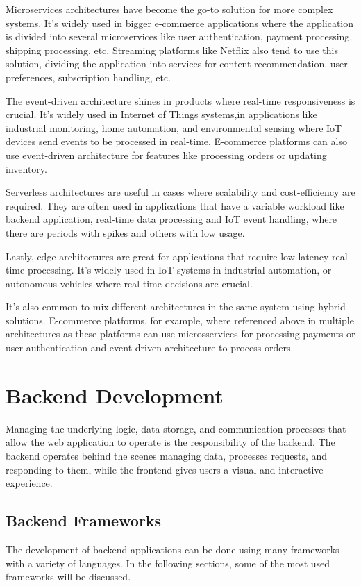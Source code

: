 Microservices architectures have become the go-to solution for more complex
systems. It's widely used in bigger e-commerce applications where the application
is divided into several microservices like user authentication, payment processing,
shipping processing, etc. Streaming platforms like Netflix also tend to use this
solution, dividing the application into services for content recommendation, user
preferences, subscription handling, etc.

The event-driven architecture shines in products where real-time
responsiveness is crucial. It's widely used in Internet of Things systems,in
applications like industrial monitoring, home automation, and environmental
sensing where \gls{IoT} devices send events to be processed in real-time.
E-commerce platforms can also use event-driven architecture for
features like processing orders or updating inventory.

Serverless architectures are useful in cases where scalability and cost-efficiency
are required. They are often used in applications that have a variable workload
like backend application, real-time data processing and \gls{IoT} event handling, where
there are periods with spikes and others with low usage.

Lastly, edge architectures are great for applications that require low-latency
real-time processing. It's widely used in \gls{IoT} systems in industrial
automation, or autonomous vehicles where real-time decisions are crucial.

It's also common to mix different architectures in the same system using
hybrid solutions. E-commerce platforms, for example, where referenced above in
multiple architectures as these platforms can use microsservices for processing
payments or user authentication and event-driven architecture to process orders.

\section{Backend Development}
Managing the underlying logic, data storage, and communication processes that
allow the web application to operate is the responsibility of the backend.
The backend operates behind the scenes managing data, processes requests, and
responding to them, while the frontend gives users a visual and interactive
experience.
\subsection{Backend Frameworks}
The development of backend applications can be done using many frameworks with
a variety of languages. In the following sections, some of the most used
frameworks will be discussed.
